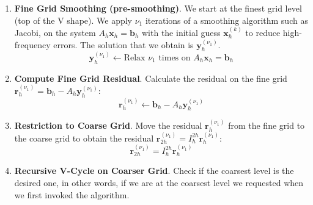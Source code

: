 \begin{enumerate}
    \item\label{enumerate: v-cycle scheme - Fine Grid Smoothing (pre-smoothing)} \textbf{Fine Grid Smoothing (pre-smoothing)}. We start at the finest grid level (top of the V shape). We apply $\nu_{1}$ iterations of a smoothing algorithm such as Jacobi, on the system $A_{h}\mathbf{x}_{h} = \mathbf{b}_{h}$ with the initial guess $\mathbf{x}_{h}^{\left(k\right)}$ to reduce high-frequency errors. The solution that we obtain is $\mathbf{y}_{h}^{\left(\nu_{1}\right)}$.
    \begin{equation*}
        \mathbf{y}_{h}^{\left(\nu_{1}\right)} \leftarrow \text{Relax } \nu_{1} \text{ times on } A_{h}\mathbf{x}_{h} = \mathbf{b}_{h}
    \end{equation*}

    \item \textbf{Compute Fine Grid Residual}. Calculate the residual on the fine grid $\mathbf{r}_{h}^{\left(\nu_{1}\right)} = \mathbf{b}_{h} - A_{h}\mathbf{y}_{h}^{\left(\nu_{1}\right)}$:
    \begin{equation*}
        \mathbf{r}_{h}^{\left(\nu_{1}\right)} \leftarrow \mathbf{b}_{h} - A_{h}\mathbf{y}_{h}^{\left(\nu_{1}\right)}
    \end{equation*}

    \item\label{enumerate: v-cycle scheme - Restriction to Coarse Grid} \textbf{Restriction to Coarse Grid}. Move the residual $\mathbf{r}_{h}^{\left(\nu_{1}\right)}$ from the fine grid to the coarse grid to obtain the residual $\mathbf{r}_{2h}^{\left(\nu_{1}\right)} = I_{h}^{2h} \mathbf{r}_{h}^{\left(\nu_{1}\right)}$:
    \begin{equation*}
        \mathbf{r}_{2h}^{\left(\nu_{1}\right)} = I_{h}^{2h} \mathbf{r}_{h}^{\left(\nu_{1}\right)}
    \end{equation*}

    \item \textbf{Recursive V-Cycle on Coarser Grid}. Check if the coarsest level is the desired one, in other words, if we are at the coarsest level we requested when we first invoked the algorithm.


\end{enumerate}
